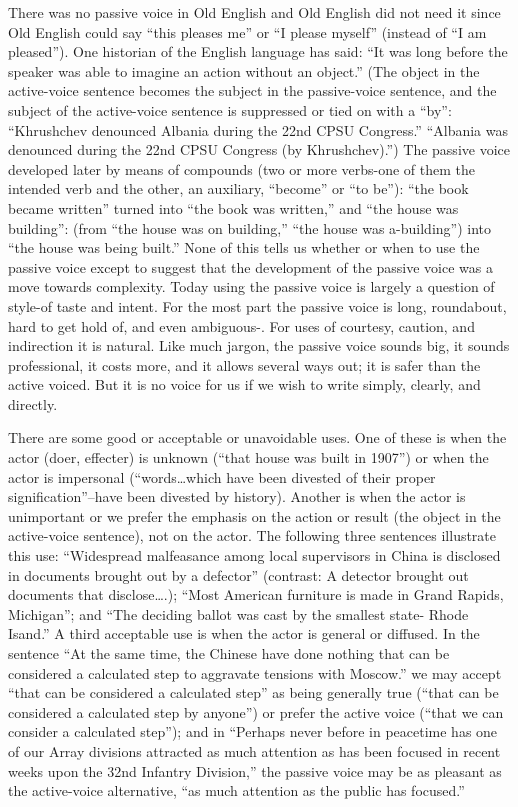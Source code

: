\documentclass[
    oneside,
    11pt,
]{memoir}
\begin{document}
There was no passive voice in Old English and Old English did not need it since Old English could say \enquote{this pleases me} or \enquote{I please myself} (instead of \enquote{I am pleased}). One historian of the English language has said: \enquote{It was long before the speaker was able to imagine an action without an object.} (The object in the active-voice sentence becomes the subject in the passive-voice sentence, and the subject of the active-voice sentence is suppressed or tied on with a \enquote{by}: \enquote{Khrushchev denounced Albania during the 22nd CPSU Congress.} \enquote{Albania was denounced during the 22nd CPSU Congress (by Khrushchev).}) The passive voice developed later by means of compounds (two or more verbs-one of them the intended verb and the other, an auxiliary, \enquote{become} or \enquote{to be}): \enquote{the book became written} turned into \enquote{the book was written,} and \enquote{the house was building}: (from \enquote{the house was on building,} \enquote{the house was a-building}) into \enquote{the house was being built.} None of this tells us whether or when to use the passive voice except to suggest that the development of the passive voice was a move towards complexity. Today using the passive voice is largely a question of style-of taste and intent. For the most part the passive voice is long, roundabout, hard to get hold of, and even ambiguous-. For uses of courtesy, caution, and indirection it is natural. Like much jargon, the passive voice sounds big, it sounds professional, it costs more, and it allows several ways out; it is safer than the active voiced. But it is no voice for us if we wish to write simply, clearly, and directly. 

There are some good or acceptable or unavoidable uses. One of these is when the actor (doer, effecter) is unknown (\enquote{that house was built in 1907}) or when the actor is impersonal (\enquote{words\dots which have been divested of their proper signification}--have been divested by history). Another is when the actor is unimportant or we prefer the emphasis on the action or result (the object in the active-voice sentence), not on the actor. The following three sentences illustrate this use: \enquote{Widespread malfeasance among local supervisors in China is disclosed in documents brought out by a defector} (contrast: A detector brought out documents that disclose\dots.); \enquote{Most American furniture is made in Grand Rapids, Michigan}; and \enquote{The deciding ballot was cast by the smallest state- Rhode Isand.} A third acceptable use is when the actor is general or diffused. In the sentence \enquote{At the same time, the Chinese have done nothing that can be considered a calculated step to aggravate tensions with Moscow.} we may accept \enquote{that can be considered a calculated step} as being generally true (\enquote{that can be considered a calculated step by anyone}) or prefer the active voice (\enquote{that we can consider a calculated step}); and in \enquote{Perhaps never before in peacetime has one of our Array divisions attracted as much attention as has been focused in recent weeks upon the 32nd Infantry Division,} the passive voice may be as pleasant as the active-voice alternative, \enquote{as much attention as the public has focused.}
\end{document}
